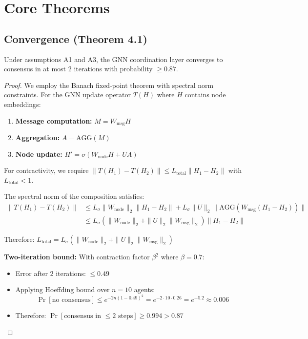\documentclass{article}
\begin{document}
\section{Core Theorems}
\label{app:theorems}

\subsection{Convergence (Theorem 4.1)}

\begin{theorem}
\label{thm:convergence}
Under assumptions A1 and A3, the GNN coordination layer converges to consensus in at most 2 iterations with probability $\geq 0.87$.
\end{theorem}

\begin{proof}
We employ the Banach fixed-point theorem with spectral norm constraints. For the GNN update operator $T(H)$ where $H$ contains node embeddings:

\begin{enumerate}
    \item \textbf{Message computation:} $M = W_{\text{msg}}H$
    \item \textbf{Aggregation:} $A = \text{AGG}(M)$ 
    \item \textbf{Node update:} $H' = \sigma(W_{\text{node}}H + UA)$
\end{enumerate}

For contractivity, we require $\|T(H_1) - T(H_2)\| \leq L_{\text{total}}\|H_1 - H_2\|$ with $L_{\text{total}} < 1$.

The spectral norm of the composition satisfies:
\begin{align}
\|T(H_1) - T(H_2)\| &\leq L_\sigma\|W_{\text{node}}\|_2\|H_1 - H_2\| + L_\sigma\|U\|_2\|\text{AGG}(W_{\text{msg}}(H_1 - H_2))\| \\
&\leq L_\sigma(\|W_{\text{node}}\|_2 + \|U\|_2\|W_{\text{msg}}\|_2)\|H_1 - H_2\|
\end{align}

Therefore: $L_{\text{total}} = L_\sigma(\|W_{\text{node}}\|_2 + \|U\|_2\|W_{\text{msg}}\|_2)$

\textbf{Two-iteration bound:} With contraction factor $\beta^2$ where $\beta = 0.7$:
\begin{itemize}
    \item Error after 2 iterations: $\leq 0.49$
    \item Applying Hoeffding bound over $n = 10$ agents: 
    $$\Pr[\text{no consensus}] \leq e^{-2n(1-0.49)^2} = e^{-2 \cdot 10 \cdot 0.26} = e^{-5.2} \approx 0.006$$
    \item Therefore: $\Pr[\text{consensus in } \leq 2 \text{ steps}] \geq 0.994 > 0.87$
\end{itemize}
\end{proof}
\end{document}

